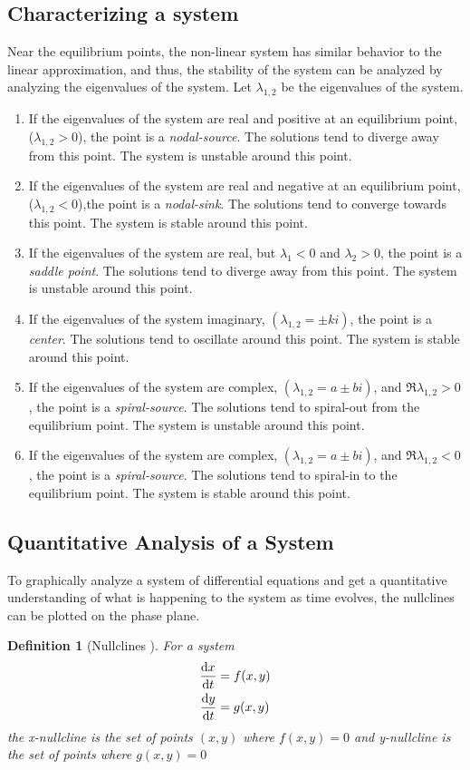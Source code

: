 \documentclass[12pt,1in]{article}
\newtheorem{definition}{Definition}
\begin{document}
\subsection{Characterizing a system}
Near the equilibrium points, the non-linear system has similar behavior to the linear approximation, and thus, the stability of the system can be analyzed by analyzing the eigenvalues of the system. Let $\lambda_{1,2}$ be the eigenvalues of the system.
\begin{enumerate}
	\item If the eigenvalues of the system are real and positive at an equilibrium point, ($\lambda_{1,2} > 0$), the point is a \emph{nodal-source}. The solutions tend to diverge away from this point. The system is unstable around this point. 
	\item If the eigenvalues of the system are real and negative at an equilibrium point, ($\lambda_{1,2} < 0$),the point is a \emph{nodal-sink}. The solutions tend to converge towards this point. The system is stable around this point. 
	\item If the eigenvalues of the system are real, but $\lambda_1 < 0$ and $\lambda_2 > 0$, the point is a \emph{saddle point}. The solutions tend to diverge away from this point. The system is unstable around this point.
	\item If the eigenvalues of the system imaginary, $(\lambda_{1,2} = \pm k i)$, the point is a \emph{center}.  The solutions tend to oscillate around this point. The system is stable around this point.
	\item If the eigenvalues of the system are complex, $(\lambda_{1,2} = a \pm b i)$, and $\Re{\lambda_{1,2}}> 0$, the point is a \emph{spiral-source}. The solutions tend to spiral-out from the equilibrium point. The system is unstable around this point.
	\item If the eigenvalues of the system are complex, $(\lambda_{1,2} = a \pm b i)$, and $\Re{\lambda_{1,2}}< 0$, the point is a \emph{spiral-source}. The solutions tend to spiral-in to the equilibrium point. The system is stable around this point.
\end{enumerate}

\subsection{Quantitative Analysis of a System}
To graphically analyze a system of differential equations and get a quantitative understanding of what is happening to the system as time evolves, the nullclines can be plotted on the phase plane. 
\begin{definition}[Nullclines \cite{diff_eq}]
	For a system 
	\begin{align*}
	\derivative{x}{t} &= f(x,y) \\
	\derivative{y}{t} &= g(x,y)
	\end{align*}
	the x-nullcline is the set of points $(x,y)$ where $f(x,y) = 0$ and y-nullcline is the set of points where $g(x,y) = 0$ 
\end{definition}
\end{document}
